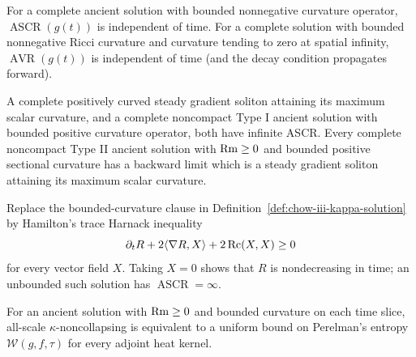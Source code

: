 \begin{theorem}
\label{thm:chow-iii-ascr-avr-time-invariance}

For a complete ancient solution with bounded nonnegative curvature operator,
$\operatorname{ASCR}(g(t))$ is independent of time.  For a complete solution
with bounded nonnegative Ricci curvature and curvature tending to zero at
spatial infinity, $\operatorname{AVR}(g(t))$ is independent of time (and the
decay condition propagates forward).
\end{theorem}

\begin{theorem}
\label{thm:chow-iii-infinite-ascr}


A complete positively curved steady gradient soliton attaining its maximum
scalar curvature, and a complete noncompact Type I ancient solution with
bounded positive curvature operator, both have infinite ASCR.  Every complete
noncompact Type II ancient solution with $\operatorname{Rm}\ge0$ and bounded positive
sectional curvature has a backward limit which is a steady gradient soliton
attaining its maximum scalar curvature.
\end{theorem}

\begin{definition}
\label{def:chow-iii-kappa-harnack}


Replace the bounded-curvature clause in Definition~\ref{def:chow-iii-kappa-solution}
by Hamilton's trace Harnack inequality
\[
\partial_tR+2\langle\nabla R,X\rangle+2\operatorname{Rc}(X,X)\ge0
\]
for every vector field $X$.  Taking $X=0$ shows that $R$ is nondecreasing in
time; an unbounded such solution has $\operatorname{ASCR}=\infty$.
\end{definition}

\begin{claim}
\label{clm:chow-iii-entropy-kappa}


For an ancient solution with $\operatorname{Rm}\ge0$ and bounded curvature on each time
slice, all-scale $\kappa$-noncollapsing is equivalent to a uniform bound on
Perelman's entropy $\mathcal W(g,f,\tau)$ for every adjoint heat kernel.
\end{claim}

